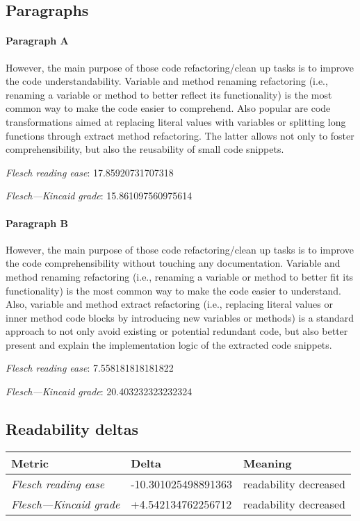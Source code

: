 \subsection{Paragraphs}
\paragraph{Paragraph A}
However, the main purpose of those code refactoring/clean up tasks is to improve the code understandability. Variable and method renaming refactoring (i.e., renaming a variable or method to better reflect its functionality) is the most common way to make the code easier to comprehend. Also popular are code transformations aimed at replacing literal values with variables or splitting long functions through extract method refactoring. The latter allows not only to foster comprehensibility, but also the reusability of small code snippets.\par\medskip\emph{Flesch reading ease}: 17.85920731707318\par\emph{Flesch---Kincaid grade}: 15.861097560975614

\paragraph{Paragraph B}
However, the main purpose of those code refactoring/clean up tasks is to improve the code comprehensibility without touching any documentation. Variable and method renaming refactoring (i.e., renaming a variable or method to better fit its functionality) is the most common way to make the code easier to understand. Also, variable and method extract refactoring (i.e., replacing literal values or inner method code blocks by introducing new variables or methods) is a standard approach to not only avoid existing or potential redundant code, but also better present and explain the implementation logic of the extracted code snippets.\par\medskip\emph{Flesch reading ease}: 7.558181818181822\par\emph{Flesch---Kincaid grade}: 20.403232323232324

\subsection{Readability deltas}

\begin{tabular}{lll}
\toprule
               \textbf{Metric} &       \textbf{Delta} &       \textbf{Meaning} \\
\midrule
    \emph{Flesch reading ease} &  -10.301025498891363 &  readability decreased \\
 \emph{Flesch---Kincaid grade} &   +4.542134762256712 &  readability decreased \\
\bottomrule
\end{tabular}

